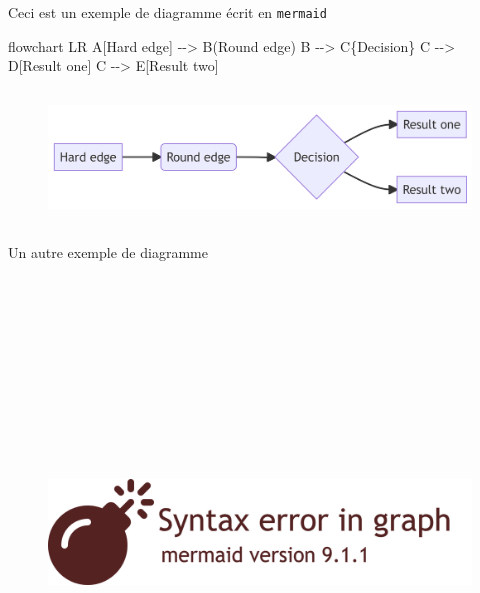 \documentclass[
  a4paper,
]{scrbook}
\newenvironment{Shaded}{\begin{snugshade}}{\end{snugshade}}
\newcommand{\NormalTok}[1]{\textcolor[rgb]{0.40,0.48,0.51}{#1}}
\begin{document}
Ceci est un exemple de diagramme écrit en \texttt{mermaid}

\begin{Shaded}
\begin{Highlighting}[numbers=left,,]

\NormalTok{flowchart LR}
\NormalTok{  A[Hard edge] {-}{-}\textgreater{} B(Round edge)}
\NormalTok{  B {-}{-}\textgreater{} C\{Decision\}}
\NormalTok{  C {-}{-}\textgreater{} D[Result one]}
\NormalTok{  C {-}{-}\textgreater{} E[Result two]}
\end{Highlighting}
\end{Shaded}

\begin{figure}[H]

{\centering \includegraphics[width=5.74in,height=1.4in]{./resultats_files/figure-latex/mermaid-figure-1.png}

}

\end{figure}

Un autre exemple de diagramme

\begin{figure}[H]

{\centering \includegraphics[width=5.33in,height=5.33in]{./resultats_files/figure-latex/mermaid-figure-2.png}

}

\end{figure}
\end{document}
